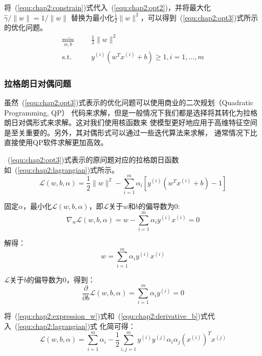 将~(\ref{equ:chap2:constrain})式代入~(\ref{equ:chap2:opt2})，并将最大化$\hat{\gamma}/\|w\|=1/\|w\|$
替换为最小化$\frac{1}{2}\|w\|^2$，可以得到~(\ref{equ:chap2:opt3})式所示的优化问题。
\begin{equation}
  \label{equ:chap2:opt3}
  \begin{aligned}
    \min_{w,b} &
    & & \frac{1}{2}\|w\|^2 \\
    \text{s.t.} &
    & & y^{(i)}\left(w^Tx^{(i)}+b\right)\geq 1, i=1,...,m
  \end{aligned}
\end{equation}

\subsubsection{拉格朗日对偶问题}

虽然~(\ref{equ:chap2:opt3})式表示的优化问题可以使用商业的二次规划（Quadratic Programming, QP）
代码来求解，但是一般情况下我们都是选择将其转化为拉格朗日对偶形式来求解。这对我们使用核函数来
使模型更好地应用于高维特征空间是至关重要的。另外，其对偶形式可以通过一些迭代算法来求解，
通常情况下比直接使用QP软件求解更加高效。

~(\ref{equ:chap2:opt3})式表示的原问题对应的拉格朗日函数如~(\ref{equ:chap2:lagrangian})式所示。
\begin{equation}
  \label{equ:chap2:lagrangian}
  \mathcal{L}(w,b,\alpha)=\frac{1}{2}\|w\|^2-\sum_{i=1}^m \alpha_i\left[y^{(i)}\left(w^Tx^{(i)}+b\right)-1\right]
\end{equation}

固定$\alpha$，最小化$\mathcal{L}(w,b,\alpha)$，即$\mathcal{L}$关于$w$和$b$的偏导数为0:
\begin{equation}
  \label{equ:chap2:derivative_w}
  \nabla_w\mathcal{L}(w,b,\alpha)=w-\sum_{i=1}^{m}\alpha_iy^{(i)}x^{(i)}=0
\end{equation}

解得：
\begin{equation}
  \label{equ:chap2:expression_w}
  w=\sum_{i=1}^{m}\alpha_iy^{(i)}x^{(i)}
\end{equation}

$\mathcal{L}$关于$b$的偏导数为0，得到：
\begin{equation}
  \label{equ:chap2:derivative_b}
  \frac{\partial}{\partial b}\mathcal{L}(w,b,\alpha)=\sum_{i=1}^m\alpha_iy^{(i)}=0
\end{equation}

将~(\ref{equ:chap2:expression_w})式和~(\ref{equ:chap2:derivative_b})式代入~(\ref{equ:chap2:lagrangian})式
化简可得：
\begin{equation}
  \label{equ:chap2:dual_objective}
  \mathcal{L}(w,b,\alpha)=\sum_{i=1}^m\alpha_i-\frac{1}{2}\sum_{i,j=1}^m
  y^{(i)}y^{(j)}\alpha_i\alpha_j(x^{(i)})^Tx^{(j)}
\end{equation}

